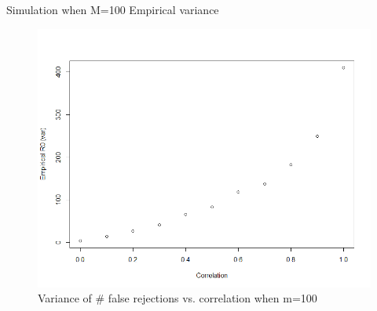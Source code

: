 \documentclass{beamer}
\begin{document}
\begin{frame}[t]{Simulation when M=100}\vspace{10pt}
Empirical variance
\begin{figure}[h]
	\centering
	\includegraphics[scale=0.35]{empirical_m=100_var}
	\caption{\footnotesize{Variance of \# false rejections vs. correlation when m=100}}
	\label{fig9}
\end{figure}

\end{frame}
\end{document}
